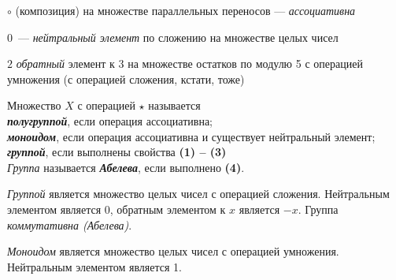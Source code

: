 \documentclass{article}
\begin{document}
    \begin{example}
        $\circ$ (композиция) на множестве параллельных переносов --- \textit{ассоциативна}
    \end{example}
    \begin{example}
        $0$~--- \textit{нейтральный элемент} по сложению на множестве целых чисел
    \end{example}
    \begin{example}
        $ 2 $ \textit{обратный} элемент к $ 3 $ на множестве остатков по модулю 5 с операцией умножения (с операцией сложения, кстати, тоже)
    \end{example}

    \begin{definition_boxed}
        Множество $X$ с операцией $\star$ называется\\
        \textit{\textbf{полугруппой}}, если операция ассоциативна;\\
        \textbf{\textit{моноидом}}, если операция ассоциативна и существует нейтральный элемент;\\
        \textbf{\textit{группой}}, если выполнены свойства \textbf{(1) -- (3)}\\
        \textit{Группа} называется \textbf{\textit{Абелева}}, если выполнено \textbf{(4)}.
    \end{definition_boxed}

    \begin{example}
        \textit{Группой} является множество целых чисел с операцией сложения.
        Нейтральным элементом является 0, обратным элементом к $x$ является $-x$.
        Группа \textit{коммутативна (Абелева)}.
    \end{example}

    \begin{example}
        \textit{Моноидом} является множество целых чисел с операцией умножения.
        Нейтральным элементом является 1.
    \end{example}
\end{document}
